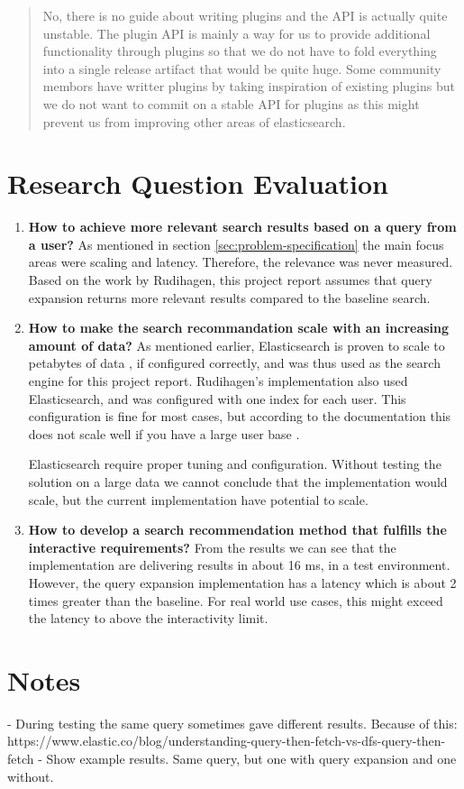 \begin{quote}
  No, there is no guide about writing plugins and the API is actually quite unstable.
  The plugin API is mainly a way for us to provide additional functionality through plugins so that we do not have to fold everything into a single release artifact that would be quite huge.
  Some community membors have writter plugins by taking inspiration of existing plugins but we do not want to commit on a stable API for plugins as this might prevent us from improving other areas of elasticsearch.
\end{quote}

\section{Research Question Evaluation}
\label{sec:reasearch-questions-evaluation}
\begin{enumerate}
  \item \textbf{How to achieve more relevant search results based on a query from a user?} \newline
  As mentioned in section \ref{sec:problem-specification} the main focus areas were scaling and latency.
  Therefore, the relevance was never measured.
  Based on the work by Rudihagen,
  this project report assumes that query expansion returns more relevant results compared to the baseline search.

  \item\label{rq:scaling} \textbf{How to make the search recommandation scale with an increasing amount of data?} \newline
  As mentioned earlier, Elasticsearch is proven to scale to petabytes of data \cite{elasticsearch-scale},
  if configured correctly, and was thus used as the search engine for this project report.
  Rudihagen's implementation also used Elasticsearch, and was configured with one index for each user.
  This configuration is fine for most cases, but according to the documentation this does not scale well if you have a large user base \cite{elasticsearch-indices}.

  Elasticsearch require proper tuning and configuration.
  Without testing the solution on a large data we cannot conclude that the implementation would scale,
  but the current implementation have potential to scale.

  \item\label{rq:latency} \textbf{How to develop a search recommendation method that fulfills the interactive requirements?} \newline
  From the results we can see that the implementation are delivering results in about 16 ms, in a test environment.
  However, the query expansion implementation has a latency which is about 2 times greater than the baseline.
  For real world use cases, this might exceed the latency to above the interactivity limit.
\end{enumerate}

\section{Notes}
- During testing the same query sometimes gave different results. Because of this: https://www.elastic.co/blog/understanding-query-then-fetch-vs-dfs-query-then-fetch
- Show example results. Same query, but one with query expansion and one without.
